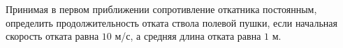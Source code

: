 Принимая в первом приближении сопротивление откатника постоянным,
определить продолжительность отката ствола полевой пушки, если начальная
скорость отката равна $10$ м/с, а средняя длина отката равна $1$ м.
